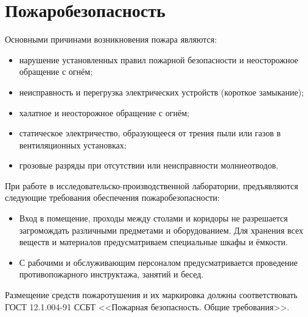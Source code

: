 \section{Пожаробезопасность}

Основными причинами возникновения пожара являются:
\begin{itemize}
	\item нарушение установленных правил пожарной безопасности и неосторожное обращение с огнём;
	\item неисправность и перегрузка электрических устройств (короткое замыкание);
	\item халатное и неосторожное обращение с огнём;
	\item статическое электричество, образующееся от трения пыли или газов в вентиляционных установках;
	\item грозовые разряды при отсутствии или неисправности молниеотводов.
\end{itemize}
При работе в исследовательско-производственной  лаборатории, предъявляются следующие требования обеспечения пожаробезопасности:
\begin{itemize}
	\item Вход в помещение, проходы между столами и коридоры не разрешается загромождать различными предметами и оборудованием. Для хранения всех веществ и материалов предусматриваем специальные шкафы и ёмкости.
	\item С рабочими и обслуживающим персоналом предусматривается проведение противопожарного инструктажа, занятий и бесед.
\end{itemize}
Размещение средств пожаротушения и их маркировка должны соответствовать ГОСТ 12.1.004-91 ССБТ <<Пожарная безопасность. Общие требования>>.
